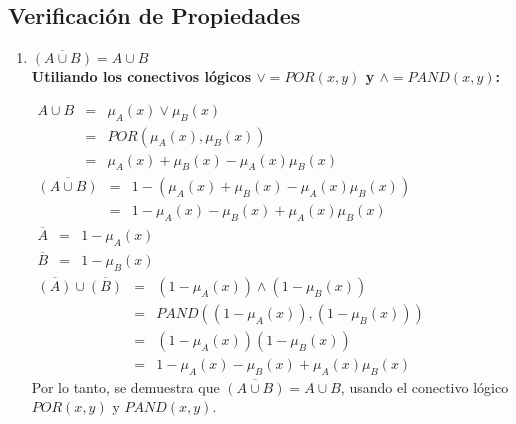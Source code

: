 \documentclass[letterpaper,spanish,11pt]{article}
\begin{document}
\subsection{Verificaci\'{o}n de Propiedades}
\begin{enumerate}
\item $\overline{(A\cup B)}= A \cup B$ \\

\textbf{Utiliando los conectivos l\'{o}gicos $\vee = POR(x,y)$ y $\wedge = PAND(x,y)$:}

$\begin{array} {lll} A \cup B & = & \mu_{A}(x) \vee \mu_{B}(x) \\ 
& = & POR(\mu_{A}(x), \mu_{B}(x)) \\ & = &\mu_{A}(x) + \mu_{B}(x) - \mu_{A}(x)\mu_{B}(x)\end{array}$\\

$\begin{array} {lll} \overline{(A \cup B)} & = & 1 - (\mu_{A}(x) + \mu_{B}(x) - \mu_{A}(x)\mu_{B}(x)) \\ &= & 1 - \mu_{A}(x) - \mu_{B}(x) + \mu_{A}(x)\mu_{B}(x)  \end{array}$\\



$\begin{array} {lll} \overline{A} & = & 1 - \mu_{A}(x)  \end{array}$\\

$\begin{array} {lll} \overline{B} & = & 1 - \mu_{B}(x)  \end{array}$\\

$\begin{array} {lll} \overline{(A)} \cup \overline{(B)} & = & (1 - \mu_{A}(x)) \wedge (1-\mu_{B}(x))  \\ &= &PAND((1 - \mu_{A}(x)) ,(1-\mu_{B}(x)) ) \\ &= & (1 - \mu_{A}(x)) (1- \mu_{B}(x)) \\ &= & 1  - \mu_{A}(x) - \mu_{B}(x) + \mu_{A}(x)\mu_{B}(x)  \end{array}$\\

Por lo tanto, se demuestra que  $\overline{(A\cup B)}= A \cup B$, usando el conectivo l\'{o}gico $POR(x,y)$ y $PAND(x,y)$.\\



\end{enumerate}
\end{document}
